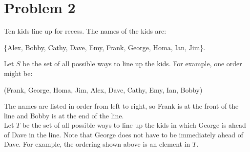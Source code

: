 \documentclass{amsart}
\theoremstyle{definition}
\theoremstyle{Exercise}
\theoremstyle{remark}
\theoremstyle{rule}
\numberwithin{equation}{section}
\begin{document}
\section*{Problem 2}
Ten kids line up for recess. The names of the kids are:\\
\begin{center}
 \{Alex, Bobby, Cathy, Dave, Emy, Frank, George, Homa, Ian, Jim\}.\\
\end{center}
Let $S$ be the set of all possible ways to line up the kids. For example, one order might be:
\begin{center}
  (Frank, George, Homa, Jim, Alex, Dave, Cathy, Emy, Ian, Bobby)\\
\end{center}

The names are listed in order from left to right, so Frank is at the front of the line and Bobby is at the end of the line.\\

Let $T$ be the set of all possible ways to line up the kids in which George is ahead of Dave in the line. Note that George does not have to be immediately ahead of Dave. For example, the ordering shown above is an element in $T$.\\
\end{document}
